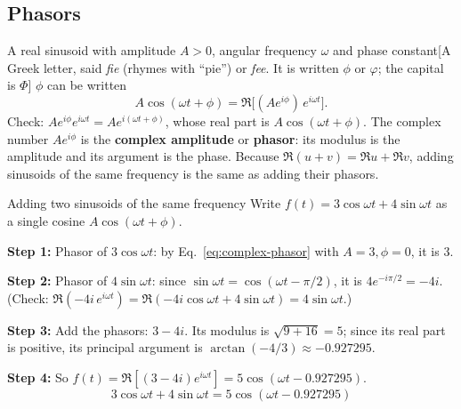 \subsection{Phasors}

A real sinusoid with amplitude $A>0$, angular frequency $\omega$ and phase constant[A Greek letter, said \emph{fie} (rhymes with ``pie'') or \emph{fee}. It is written $\phi$ or $\varphi$; the capital is $\Phi$] $\phi$ can be written
\begin{equation}
A\cos(\omega t+\phi)=\Re\bigl[(Ae^{i\phi})\,e^{i\omega t}\bigr].\label{eq:complex-phasor}
\end{equation}
Check: $Ae^{i\phi}e^{i\omega t}=Ae^{i(\omega t+\phi)}$, whose real part is $A\cos(\omega t+\phi)$. The complex number $Ae^{i\phi}$ is the \textbf{complex amplitude} or \textbf{phasor}: its modulus is the amplitude and its argument is the phase. Because $\Re(u+v)=\Re u+\Re v$, adding sinusoids of the same frequency is the same as adding their phasors.

\begin{sample}{Adding two sinusoids of the same frequency}
Write $f(t)=3\cos\omega t+4\sin\omega t$ as a single cosine $A\cos(\omega t+\phi)$.

\textbf{Step 1:} Phasor of $3\cos\omega t$: by Eq.~\eqref{eq:complex-phasor} with $A=3,\phi=0$, it is $3$.

\textbf{Step 2:} Phasor of $4\sin\omega t$: since $\sin\omega t=\cos(\omega t-\pi/2)$, it is $4e^{-i\pi/2}=-4i$. (Check: $\Re(-4i\,e^{i\omega t})=\Re(-4i\cos\omega t+4\sin\omega t)=4\sin\omega t$.)

\textbf{Step 3:} Add the phasors: $3-4i$. Its modulus is $\sqrt{9+16}=5$; since its real part is positive, its principal argument is $\arctan(-4/3)\approx-0.927295$.

\textbf{Step 4:} So $f(t)=\Re[(3-4i)e^{i\omega t}]=5\cos(\omega t-0.927295)$.
\[
\boxed{3\cos\omega t+4\sin\omega t=5\cos(\omega t-0.927295)}
\]
\end{sample}

